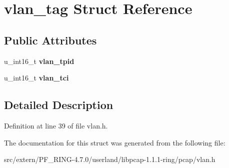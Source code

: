 \hypertarget{structvlan__tag}{
\section{vlan\_\-tag Struct Reference}
\label{structvlan__tag}
}
\subsection*{Public Attributes}
\begin{DoxyCompactItemize}
\item 
\hypertarget{structvlan__tag_a4e48c69583021f9769f6686fb250e2b0}{
u\_\-int16\_\-t {\bfseries vlan\_\-tpid}}
\label{structvlan__tag_a4e48c69583021f9769f6686fb250e2b0}

\item 
\hypertarget{structvlan__tag_a4b3e5e7392d8620f6345a8d511243b2b}{
u\_\-int16\_\-t {\bfseries vlan\_\-tci}}
\label{structvlan__tag_a4b3e5e7392d8620f6345a8d511243b2b}

\end{DoxyCompactItemize}


\subsection{Detailed Description}


Definition at line 39 of file vlan.h.



The documentation for this struct was generated from the following file:\begin{DoxyCompactItemize}
\item 
src/extern/PF\_\-RING-\/4.7.0/userland/libpcap-\/1.1.1-\/ring/pcap/vlan.h\end{DoxyCompactItemize}

